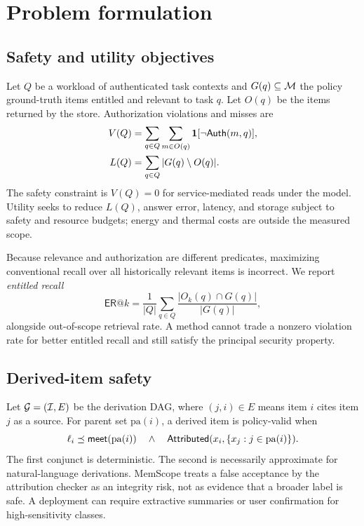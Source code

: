 \section{Problem formulation}
\label{sec:problem}

\subsection{Safety and utility objectives}

Let $Q$ be a workload of authenticated task contexts and $G(q)\subseteq\mathcal{M}$ the policy ground-truth items entitled and relevant to task $q$. Let $O(q)$ be the items returned by the store. Authorization violations and misses are
\begin{align}
V(Q)&=\sum_{q\in Q}\sum_{m\in O(q)}\mathbf{1}[\neg\mathsf{Auth}(m,q)],\\
L(Q)&=\sum_{q\in Q}|G(q)\setminus O(q)|.
\end{align}
The safety constraint is $V(Q)=0$ for service-mediated reads under the model. Utility seeks to reduce $L(Q)$, answer error, latency, and storage subject to safety and resource budgets; energy and thermal costs are outside the measured scope.

Because relevance and authorization are different predicates, maximizing conventional recall over all historically relevant items is incorrect. We report \emph{entitled recall}
\begin{equation}
\mathsf{ER@}k=\frac{1}{|Q|}\sum_{q\in Q}\frac{|O_k(q)\cap G(q)|}{|G(q)|},
\end{equation}
alongside out-of-scope retrieval rate. A method cannot trade a nonzero violation rate for better entitled recall and still satisfy the principal security property.

\subsection{Derived-item safety}

Let $\mathcal{G}=(\mathcal{I},E)$ be the derivation DAG, where $(j,i)\in E$ means item $i$ cites item $j$ as a source. For parent set $\mathrm{pa}(i)$, a derived item is policy-valid when
\begin{equation}
\ell_i\preceq\mathsf{meet}(\mathrm{pa}(i))
\quad\wedge\quad
\mathsf{Attributed}(x_i,\{x_j:j\in\mathrm{pa}(i)\}).
\label{eq:derived-validity}
\end{equation}
The first conjunct is deterministic. The second is necessarily approximate for natural-language derivations. MemScope treats a false acceptance by the attribution checker as an integrity risk, not as evidence that a broader label is safe. A deployment can require extractive summaries or user confirmation for high-sensitivity classes.

